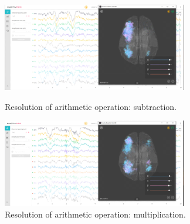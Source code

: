 \documentclass[english]{textolivre}
\begin{document}
\begin{figure}[htbp]
 \centering
 \begin{minipage}{.45\textwidth}
 \includegraphics[width=\textwidth]{Fig8.png}
 \caption{Resolution of arithmetic operation: subtraction.}
 \label{fig08}
 \end{minipage}%
 \qquad
 \begin{minipage}{0.45\textwidth}
 \includegraphics[width=\textwidth]{Fig9.png}
 \caption{Resolution of arithmetic operation: multiplication.}
 \label{fig09}
 \end{minipage}%
\end{figure}
\end{document}
